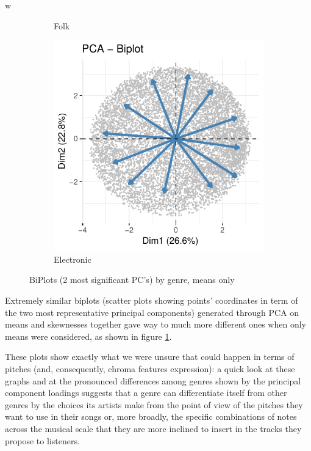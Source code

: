 w\documentclass[11pt, oneside]{article}
\begin{document}
\begin{figure}[h!]
\begin{subfigure}[b]{0.5\textwidth}
        \caption{Folk}
    \end{subfigure}%
    \begin{subfigure}[b]{0.5\textwidth}
        \includegraphics[width=\textwidth]{elec_bipl.pdf} 
        \caption{Electronic}
    \end{subfigure}%
\caption{BiPlots (2 most significant PC's) by genre, means only}
\label{fig:biplots}
\end{figure}

Extremely similar biplots (scatter plots showing points' coordinates in term of the two most representative principal components) generated through PCA on means and skewnesses together gave way to much more different ones when only means were considered, as shown in figure \ref{fig:biplots}.


These plots show exactly what we were unsure that could happen in terms of pitches (and, consequently, chroma features expression): a quick look at these graphs and at the pronounced differences among genres shown by the principal component loadings suggests that a genre can differentiate itself from other genres by the choices its artists make from the point of view of the pitches they want to use in their songs or, more broadly, the specific combinations of notes across the musical scale that they are more inclined to insert in the tracks they propose to listeners.
\end{document}
